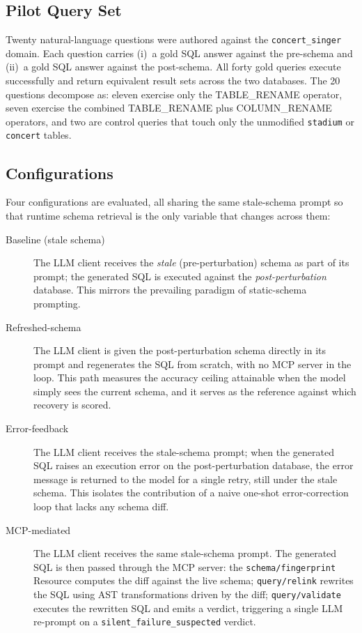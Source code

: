 \documentclass[conference,10pt,a4paper]{IEEEtran}
\begin{document}
\subsection{Pilot Query Set}
Twenty natural-language questions were authored against the
\texttt{concert\_singer} domain. Each question carries (i)~a gold SQL
answer against the pre-schema and (ii)~a gold SQL answer against the
post-schema. All forty gold queries execute successfully and return
equivalent result sets across the two databases. The 20 questions
decompose as: eleven exercise only the TABLE\_RENAME operator, seven
exercise the combined TABLE\_RENAME plus COLUMN\_RENAME operators, and
two are control queries that touch only the unmodified \texttt{stadium} or
\texttt{concert} tables.

\subsection{Configurations}
Four configurations are evaluated, all sharing the same stale-schema
prompt so that runtime schema retrieval is the only variable that changes
across them:
\begin{description}
  \item[Baseline (stale schema)] The LLM client receives the \emph{stale}
    (pre-perturbation) schema as part of its prompt; the generated SQL is
    executed against the \emph{post-perturbation} database. This mirrors
    the prevailing paradigm of static-schema prompting.
  \item[Refreshed-schema] The LLM client is given the post-perturbation
    schema directly in its prompt and regenerates the SQL from scratch,
    with no MCP server in the loop. This path measures the accuracy
    ceiling attainable when the model simply sees the current schema, and
    it serves as the reference against which recovery is scored.
  \item[Error-feedback] The LLM client receives the stale-schema prompt;
    when the generated SQL raises an execution error on the
    post-perturbation database, the error message is returned to the model
    for a single retry, still under the stale schema. This isolates the
    contribution of a naive one-shot error-correction loop that lacks any
    schema diff.
  \item[MCP-mediated] The LLM client receives the same stale-schema prompt.
    The generated SQL is then passed through the MCP server: the
    \texttt{schema/fingerprint} Resource computes the diff against the live
    schema; \texttt{query/relink} rewrites the SQL using AST transformations
    driven by the diff; \texttt{query/validate} executes the rewritten SQL
    and emits a verdict, triggering a single LLM re-prompt on a
    \texttt{silent\_failure\_suspected} verdict.
\end{description}
\end{document}

